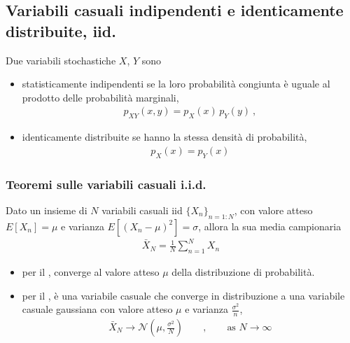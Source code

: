 \documentclass[letterpaper,10pt,italian]{jupyterBook}
\begin{document}
\subsection{Variabili casuali indipendenti e identicamente distribuite, iid.}
\label{\detokenize{ch/statistics/iid:variabili-casuali-indipendenti-e-identicamente-distribuite-iid}}\label{\detokenize{ch/statistics/iid::doc}}
\sphinxAtStartPar
Due variabili stochastiche \(X\), \(Y\) sono
\begin{itemize}
\item {} 
\sphinxAtStartPar
statisticamente indipendenti se la loro probabilità congiunta è uguale al prodotto delle probabilità marginali,
\begin{equation*}
\begin{split}p_{XY}(x,y) = p_X(x) \, p_Y(y) \ ,\end{split}
\end{equation*}
\item {} 
\sphinxAtStartPar
identicamente distribuite se hanno la stessa densità di probabilità,
\begin{equation*}
\begin{split}p_X(x) = p_Y(x)\end{split}
\end{equation*}
\end{itemize}


\subsubsection{Teoremi sulle variabili casuali i.i.d.}
\label{\detokenize{ch/statistics/iid:teoremi-sulle-variabili-casuali-i-i-d}}
\sphinxAtStartPar
Dato un insieme di \(N\) variabili casuali iid \(\{ X_n \}_{n=1:N}\), con valore atteso \(E[X_n] = \mu\) e varianza \(E[(X_n - \mu)^2] = \sigma\), allora la sua media campionaria
\begin{equation*}
\begin{split}\bar{X}_N = \frac{1}{N} \sum_{n=1}^N X_n \ \end{split}
\end{equation*}\begin{itemize}
\item {} 
\sphinxAtStartPar
per il , converge al valore atteso \(\mu\) della distribuzione di probabilità.

\item {} 
\sphinxAtStartPar
per il , è una variabile casuale che converge in distribuzione a una variabile casuale gaussiana con valore atteso \(\mu\) e varianza \(\frac{\sigma^2}{n}\),
\begin{equation*}
\begin{split}\bar{X}_N \rightarrow \mathscr{N}\left(\mu, \frac{\sigma^2}{N} \right) \qquad , \qquad \text{as $N \rightarrow \infty$}\end{split}
\end{equation*}
\end{itemize}
\end{document}
